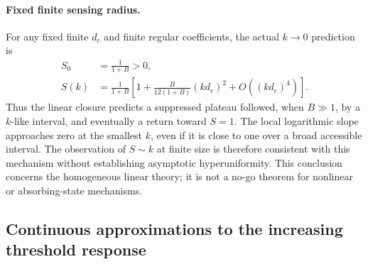 \documentclass{article}
\begin{document}
\paragraph{Fixed finite sensing radius.}
For any fixed finite $d_c$ and finite regular coefficients, the actual $k\to0$ prediction is
\begin{align}
    S_0&=\frac{1}{1+B}>0,\\
    S(k)&=\frac{1}{1+B}
    \left[1+\frac{B}{12(1+B)}(kd_c)^2+O((kd_c)^4)\right].
    \label{eq:ffPlateau}
\end{align}
Thus the linear closure predicts a suppressed plateau followed, when $B\gg1$, by a $k$-like interval, and eventually a return toward $S=1$. The local logarithmic slope approaches zero at the smallest $k$, even if it is close to one over a broad accessible interval. The observation of $S\sim k$ at finite size is therefore consistent with this mechanism without establishing asymptotic hyperuniformity. This conclusion concerns the homogeneous linear theory; it is not a no-go theorem for nonlinear or absorbing-state mechanisms.


\subsection{Continuous approximations to the increasing threshold response}
\end{document}
